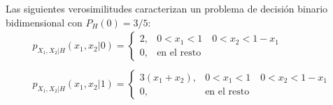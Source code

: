 \ifspanish

\question Las siguientes verosimilitudes caracterizan un problema de decisión binario bidimensional con  $P_H(0)=3/5$:
$$	\begin{array}{l}
					  p_{X_1,X_2|H}(x_1,x_2|0) = \left\lbrace   \begin{array}{ll} 
					  2, &  0<x_1<1 \quad 0<x_2<1-x_1  \\
					  0, & \mbox{en el resto}					  
					   \end{array}\right.  \\ 
					   \; \\
					  p_{X_1,X_2|H}(x_1,x_2|1) = \left\lbrace   \begin{array}{ll} 
					  3\left( x_1+x_2\right) , & 0<x_1<1 \quad 0<x_2<1-x_1 \\
					  0, & \mbox{en el resto}					  
					   \end{array}\right.  			
					  \end{array}	  $$
 
